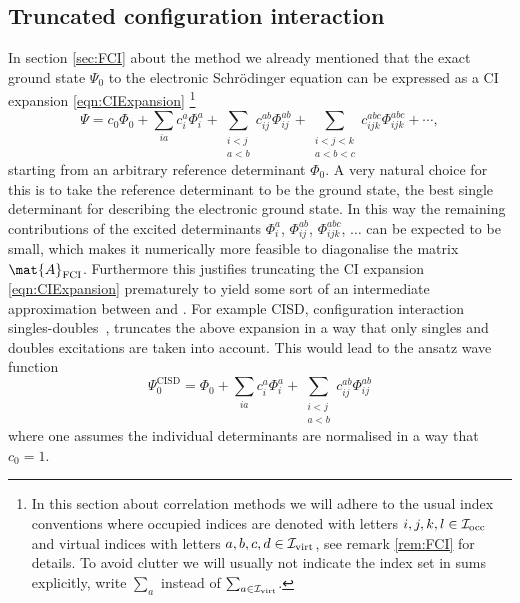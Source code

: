 \subsection{Truncated configuration interaction}
\label{sec:TruncatedCI}
In section \vref{sec:FCI} about the \FCI method we already
mentioned that the exact ground state $\Psi_0$ to the electronic Schrödinger equation
can be expressed as a CI expansion \eqref{eqn:CIExpansion}%
\footnote{
	In this section about correlation methods
	we will adhere to the usual index conventions
	where occupied indices are denoted with letters
	$i,j,k,l \in \mathcal{I}_\text{occ}$ and virtual indices with letters $a,b,c,d \in \mathcal{I}_\text{virt}$,
	see remark \vref{rem:FCI} for details.
	To avoid clutter we will usually not indicate the index set in sums explicitly,
	\eg write $\sum_a$ instead of $\sum_{a \in \mathcal{I}_\text{virt}}$.
}
\[
	\Psi
	= c_0 \Phi_0 + \sum_{ia} c_i^a \Phi_i^a
	+ \sum_{\substack{i<j \\a<b}} c_{ij}^{ab} \Phi_{ij}^{ab}
	+ \sum_{\substack{i<j<k \\ a<b<c}} c_{ijk}^{abc} \Phi_{ijk}^{abc}
	 + \cdots,
\]
starting from an arbitrary reference determinant $\Phi_0$.
A very natural choice for this is to take the reference
determinant to be the \HF ground state,
\ie the best single determinant for describing the electronic ground state.
In this way the
remaining contributions of the excited determinants $\Phi_i^a$,
$\Phi_{ij}^{ab}$, $\Phi_{ijk}^{abc}$, $\ldots$
can be expected to be small,
which makes it numerically more feasible to diagonalise
the \FCI matrix $\mat{A}_\text{FCI}$.
Furthermore this justifies truncating the CI expansion \eqref{eqn:CIExpansion}
prematurely to yield some sort of an intermediate approximation
between \HF and \FCI.
For example CISD, configuration interaction singles-doubles~\cite{Sherrill1999},
truncates the above expansion in a way that only singles and doubles
excitations are taken into account.
This would lead to the ansatz wave function
\[
	\Psi_0^\text{CISD}
	= \Phi_0 + \sum_{ia} c_i^a \Phi_i^a
	+ \sum_{\substack{i<j \\a<b}} c_{ij}^{ab} \Phi_{ij}^{ab}
\]
where one assumes the individual determinants
are normalised in a way that $c_0 = 1$.

